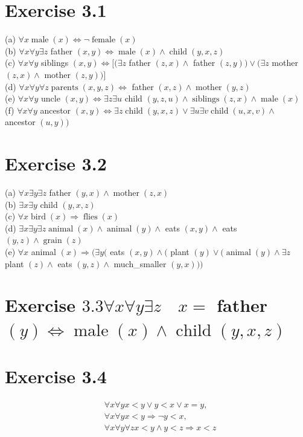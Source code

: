 \documentclass[10pt]{article}
\begin{document}
\section*{Exercise 3.1}
(a) $\forall x \operatorname{male}(x) \Leftrightarrow \neg \operatorname{female}(x)$\\
(b) $\forall x \forall y \exists z$ father $(x, y) \Leftrightarrow \operatorname{male}(x) \wedge \operatorname{child}(y, x, z)$\\
(c) $\forall x \forall y$ siblings $(x, y) \Leftrightarrow[(\exists z$ father $(z, x) \wedge$ father $(z, y)) \vee(\exists z$ mother $(z, x) \wedge$ mother $(z, y))]$\\
(d) $\forall x \forall y \forall z \operatorname{parents}(x, y, z) \Leftrightarrow$ father $(x, z) \wedge \operatorname{mother}(y, z)$\\
(e) $\forall x \forall y$ uncle $(x, y) \Leftrightarrow \exists z \exists u$ child $(y, z, u) \wedge \operatorname{siblings}(z, x) \wedge \operatorname{male}(x)$\\
(f) $\forall x \forall y$ ancestor $(x, y) \Leftrightarrow \exists z \operatorname{child}(y, x, z) \vee \exists u \exists v \operatorname{child}(u, x, v) \wedge$ ancestor $(u, y))$

\section*{Exercise 3.2}
(a) $\forall x \exists y \exists z$ father $(y, x) \wedge \operatorname{mother}(z, x)$\\
(b) $\exists x \exists y$ child $(y, x, z)$\\
(c) $\forall x \operatorname{bird}(x) \Rightarrow \operatorname{flies}(x)$\\
(d) $\exists x \exists y \exists z \operatorname{animal}(x) \wedge \operatorname{animal}(y) \wedge$ eats $(x, y) \wedge$ eats $(y, z) \wedge \operatorname{grain}(z)$\\
(e) $\forall x$ animal $(x) \Rightarrow(\exists y($ eats $(x, y) \wedge($ plant $(y) \vee(\operatorname{animal}(y) \wedge \exists z$ plant $(z) \wedge$ eats $(y, z) \wedge$ much\_smaller $(y, x)))$

\section*{Exercise $3.3 \forall x \forall y \exists z \quad x=$ father $(y) \Leftrightarrow \operatorname{male}(x) \wedge \operatorname{child}(y, x, z)$}
\section*{Exercise 3.4}
$$
\begin{aligned}
& \forall x \forall y x<y \vee y<x \vee x=y, \\
& \forall x \forall y x<y \Rightarrow \neg y<x, \\
& \forall x \forall y \forall z x<y \wedge y<z \Rightarrow x<z
\end{aligned}
$$
\end{document}
